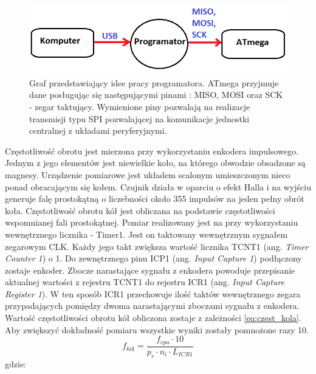   \begin{figure}[H]
    \begin{center}
      \includegraphics[scale=0.7]{imgs/schemat_prog.png}
 	\caption[Podłączenie programatora.]{\small{Graf przedstawiający idee pracy programatora. ATmega przyjmuje dane posługując się następującymi pinami : MISO, MOSI oraz SCK - zegar taktujący. Wymienione piny pozwalają na realizacje transmisji typu SPI pozwalającej na komunikacje jednostki centralnej z układami peryferyjnymi.}}
	\label{schem_ster}
    \end{center}
  \end{figure}  
  
Częstotliwość obrotu jest mierzona przy wykorzystaniu enkodera impulsowego. Jednym z jego elementów jest niewielkie koło, na którego obwodzie obsadzone są magnesy. Urządzenie pomiarowe jest układem scalonym umieszczonym nieco ponad obracającym się kołem. Czujnik działa w oparciu o efekt Halla i na wyjściu generuje falę prostokątną o liczebności około 355 impulsów na jeden pełny obrót koła. Częstotliwość obrotu kół jest obliczana na podstawie częstotliwości wspomnianej fali prostokątnej. Pomiar realizowany jest na przy wykorzystaniu wewnętrznego licznika - Timer1. Jest on taktowany wewnętrznym sygnałem zegarowym CLK. Każdy jego takt zwiększa wartość licznika TCNT1 (ang. \textit{Timer Counter 1}) o 1. Do zewnętrznego pinu ICP1 (ang. \textit{Input Capture 1}) podłączony zostaje enkoder. Zbocze narastające sygnału z enkodera powoduje przepisanie aktualnej wartości z rejestru TCNT1 do rejestru ICR1 (ang. \textit{Input Capture Register 1}). W ten sposób ICR1 przechowuje ilość taktów wewnętrznego zegara przypadających pomiędzy dwoma narastającymi zboczami sygnału z enkodera. Wartość częstotliwości obrotu kół obliczona zostaje z zależności \ref{eq:czest_kola}. Aby zwiększyć dokładność pomiaru wszystkie wyniki zostały pomnożone razy 10.
\begin{equation}
	f_{kół} =  \frac{f_{cpu} \cdot 10}{p_r \cdot n_i \cdot L_{ICR1} } 
   \label{eq:czest_kola}
 \end{equation}
 gdzie:  
 \begin{equationDescriptor}
 \end{equationDescriptor} 

